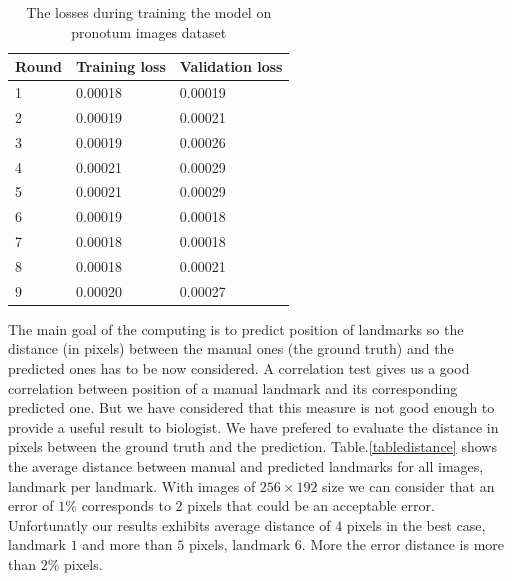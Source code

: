\documentclass[10pt]{article}
\begin{document}
\begin{table}[h!]
	\centering
	\begin{tabular}{l l l}
	Round & Training loss & Validation loss \\ \hline
	1 & 0.00018 & 0.00019  \\ \hline
	2 & 0.00019 & 0.00021 \\ \hline
	3 & 0.00019 & 0.00026 \\ \hline
	4 & 0.00021 & 0.00029 \\ \hline
	5 & 0.00021 & 0.00029 \\ \hline
	6 & 0.00019 & 0.00018 \\ \hline
	7 & 0.00018 & 0.00018 \\ \hline
	8 & 0.00018 & 0.00021 \\ \hline
	9 & 0.00020 & 0.00027 \\ \hline
	\end{tabular}
	\caption{\small{The losses during training the model on pronotum images dataset}}
	\label{tbltrainingloss}
\end{table}

The main goal of the computing is to predict position of landmarks so
the distance (in pixels) between the manual ones (the ground truth)
and the predicted ones has to be now considered. A correlation test
gives us a good correlation between position of a manual landmark and
its corresponding predicted one. But we have considered that this
measure is not good enough to provide a useful result to biologist. We
have prefered to evaluate the distance in pixels between the ground
truth and the prediction. Table.\ref{tabledistance} shows the
average distance between manual and predicted landmarks for all
images, landmark per landmark. With images of $256 \times 192$ size we
can consider that an error of $1\%$ corresponds to $2$ pixels that
could be an acceptable error. Unfortunatly our results exhibits
average distance of $4$ pixels in the best case, landmark $1$ and more
than $5$ pixels, landmark $6$. More the error distance is more than  $2\%$
pixels.
\end{document}
